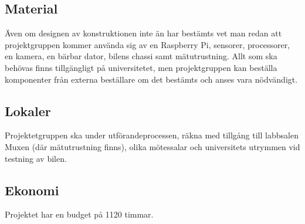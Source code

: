 \documentclass[projektplan/plan.tex]{subfiles}
\begin{document}
\subsection{Material}
Även om designen av konstruktionen inte än har bestämts vet man redan att
projektgruppen kommer använda sig av en Raspberry Pi, sensorer, processorer, en
kamera, en bärbar dator, bilens chassi samt mätutrustning. Allt som ska
behövas finns tillgängligt  på universitetet, men projektgruppen kan beställa
komponenter från externa beställare om det bestämts och anses vara nödvändigt.

\subsection{Lokaler}
Projektetgruppen ska under utförandeprocessen, räkna med tillgång till
labbsalen Muxen (där mätutrustning finns), olika mötessalar och universitets
utrymmen vid testning av bilen.

\subsection{Ekonomi}
Projektet har en budget på 1120 timmar.
\end{document}
